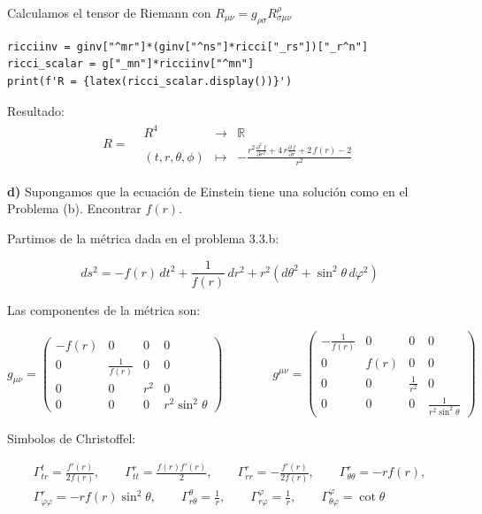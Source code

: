 \documentclass{article}
\begin{document}
\hfill 

\hfill 

\hfill 

Calculamos el tensor de Riemann con $ R _{\mu\nu} = g _{\rho\sigma} R _{\sigma\mu\nu}^\rho  $
\begin{verbatim}
ricciinv = ginv["^mr"]*(ginv["^ns"]*ricci["_rs"])["_r^n"]
ricci_scalar = g["_mn"]*ricciinv["^mn"]
print(f'R = {latex(ricci_scalar.display())}')
\end{verbatim}
Resultado: 
\begin{gather*}
R = \begin{array}{llcl} & R^4 & \longrightarrow & \mathbb{R} \\ & \left(t, r, {\theta}, {\phi}\right) & \longmapsto & -\frac{r^{2} \frac{\partial^2\,f}{\partial r ^ 2} + 4 \, r \frac{\partial\,f}{\partial r} + 2 \, f\left(r\right) - 2}{r^{2}} \end{array}
\end{gather*}

\hfill 

\hfill 

\hfill 

\textbf{d) }
Supongamos que la ecuación de Einstein tiene una solución como en el Problema (b). Encontrar \( f(r) \).

Partimos de la métrica dada en el problema 3.3.b:

\[ ds^2 = -f(r) \, dt^2 + \frac{1}{f(r)} \, dr^2 + r^2 \left( d\theta^2 + \sin^2\theta \, d\varphi^2 \right) \]

Las componentes de la métrica son:

\[
g_{\mu\nu} = \begin{pmatrix}
-f(r) & 0 & 0 & 0 \\
0 & \frac{1}{f(r)} & 0 & 0 \\
0 & 0 & r^2 & 0 \\
0 & 0 & 0 & r^2 \sin^2 \theta
\end{pmatrix} \qquad \qquad 
g^{\mu\nu} = \begin{pmatrix}
-\frac{1}{f(r)} & 0 & 0 & 0 \\
0 & f(r) & 0 & 0 \\
0 & 0 & \frac{1}{r^2} & 0 \\
0 & 0 & 0 & \frac{1}{r^2 \sin^2 \theta}
\end{pmatrix}
\]

Simbolos de Christoffel:

\begin{gather*}
\Gamma^t_{tr} = \frac{f'(r)}{2f(r)}, \qquad
\Gamma^r_{tt} = \frac{f(r) f'(r)}{2}, \qquad
\Gamma^r_{rr} = -\frac{f'(r)}{2f(r)}, \qquad
\Gamma^r_{\theta\theta} = -r f(r), \\
\Gamma^r_{\varphi\varphi} = -r f(r) \sin^2 \theta, \qquad
\Gamma^\theta_{r\theta} = \frac{1}{r}, \qquad
\Gamma^\varphi_{r\varphi} = \frac{1}{r}, \qquad
\Gamma^\varphi_{\theta\varphi} = \cot \theta
\end{gather*}
\end{document}
